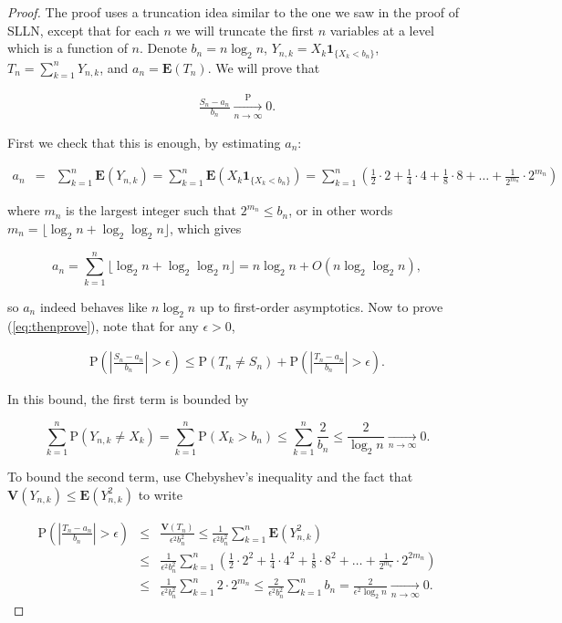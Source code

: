 \documentclass[11pt]{report}
\theoremstyle{plain}
\theoremstyle{definition}
\begin{document}
\begin{proof}
The proof uses a truncation idea similar to the one
we saw in the proof of SLLN, except that for each $n$
we will truncate the first $n$ variables at a level
which is a function of $n$. Denote $b_n = n\log_2 n$,
$Y_{n,k} = X_k \mathbf{1}_{\{X_k<b_n\}}$,
$T_n=\sum_{k=1}^n Y_{n,k}$, and
$a_n = \mathbf{E}(T_n)$. We will prove that

\begin{align*}
\tag{20}\label{eq:thenprove}
\frac{S_n-a_n}{b_n}\xrightarrow[n\to\infty]{\mathrm{P}} 0.
\end{align*}

First we check that this is enough, by estimating
$a_n$:

\begin{eqnarray*}
a_n &=& \sum_{k=1}^n \mathbf{E}(Y_{n,k}) = \sum_{k=1}^n \mathbf{E}(X_k \mathbf{1}_{\{X_k<b_n\}})
= \sum_{k=1}^n \left(\frac12\cdot 2 + \frac14\cdot 4 + \frac18 \cdot 8 + \ldots + \frac{1}{2^{m_{n}}}\cdot 2^{m_{n}}
\right)
\end{eqnarray*}

where $m_n$ is the largest integer such that
$2^{m_n} \le b_n$, or in other words
$m_n = \lfloor \log_2 n + \log_2 \log_2 n \rfloor$,
which gives

\[
a_n = \sum_{k=1}^n \lfloor \log_2 n + \log_2 \log_2 n \rfloor = n \log_2 n + O(n \log_2 \log_2 n),
\]

so $a_n$ indeed behaves like $n\log_2 n$ up to
first-order asymptotics. Now to prove
(\ref{eq:thenprove}), note that for any $\epsilon>0$,

\begin{align*}
\tag{21}\label{eq:lhs}
\mathrm{P}\left( \left|\frac{S_n-a_n}{b_n}\right| > \epsilon\right) \le
\mathrm{P}(T_n\neq S_n) + \mathrm{P}\left( \left|\frac{T_n-a_n}{b_n}\right| > \epsilon\right).
\end{align*}

In this bound, the first term is bounded by

\[
\sum_{k=1}^n \mathrm{P}(Y_{n,k}\neq X_k) = \sum_{k=1}^n \mathrm{P}(X_k>b_n) \le \sum_{k=1}^n \frac{2}{b_n}
\le \frac{2}{\log_2 n} \xrightarrow[n\to\infty]{} 0.
\]

To bound the second term, use Chebyshev's inequality
and the fact that
$\mathbf{V}(Y_{n,k})\le \mathbf{E}(Y_{n,k}^2)$ to
write

\begin{eqnarray*}
\mathrm{P}\left( \left|\frac{T_n-a_n}{b_n}\right| > \epsilon\right) &\le& \frac{\mathbf{V}(T_n)}{\epsilon^2 b_n^2}
\le \frac{1}{\epsilon^2 b_n^2} \sum_{k=1}^n \mathbf{E}(Y_{n,k}^2) \\
&\le& \frac{1}{\epsilon^2 b_n^2} \sum_{k=1}^n
\left(\frac12\cdot 2^2 + \frac14\cdot 4^2 + \frac18 \cdot 8^2 + \ldots + \frac{1}{2^{m_{n}}}\cdot 2^{2m_{n}} \right) \\
&\le&
\frac{1}{\epsilon^2 b_n^2} \sum_{k=1}^n 2\cdot 2^{m_n}
\le \frac{2}{\epsilon^2 b_n^2} \sum_{k=1}^n b_n = \frac{2}{\epsilon^2 \log_2 n} \xrightarrow[n\to\infty]{} 0.
\end{eqnarray*}


\end{proof}
\end{document}
